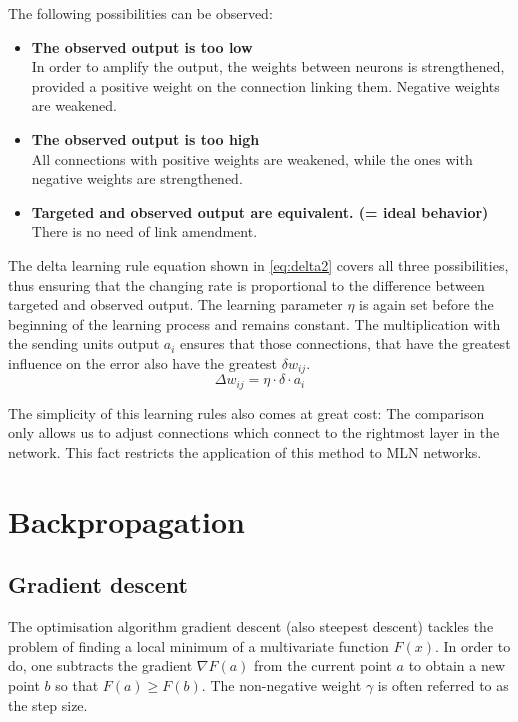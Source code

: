 \documentclass[10pt,a4paper,DIV=11]{scrreprt}
\begin{document}
The following possibilities can be observed:
\begin{itemize}
\item \textbf{The observed output is too low}\\
In order to amplify the output, the weights between neurons is strengthened, provided a positive weight on the connection linking them. 
Negative weights are weakened.
\item \textbf{The observed output is too high}\\
All connections with positive weights are weakened, while the ones with negative weights are strengthened.
\item \textbf{Targeted and observed output are equivalent. (= ideal behavior)}\\ There is no need of link amendment.
\end{itemize}

The delta learning rule equation shown in \eqref{eq:delta2} covers all three possibilities, thus ensuring that the changing rate is proportional to 
the difference between targeted and observed output. The learning parameter $\eta$ is again set before the beginning of the learning process and 
remains constant. The multiplication with the sending units output $a_i$ ensures that those connections, that have the greatest influence on the 
error also have the greatest $\delta w_{ij}$.
\begin{equation}
\Delta w_{ij} = \eta \cdot \delta \cdot a_i
\label{eq:delta2}
\end{equation}

The simplicity of this learning rules also comes at great cost: The comparison only allows us to adjust connections which connect to the rightmost 
layer in the network. This fact restricts the application of this method to MLN networks.

\section{Backpropagation}

\subsection{Gradient descent}

The optimisation algorithm gradient descent (also steepest descent) tackles the problem of finding a local minimum of a multivariate function $F(x)$.
In order to do, one subtracts the gradient $\nabla F(a)$ from the current point $a$ to obtain a new point $b$ so that $F(a) \geq F(b)$. 
The non-negative weight $\gamma$ is often referred to as the step size.
\end{document}
